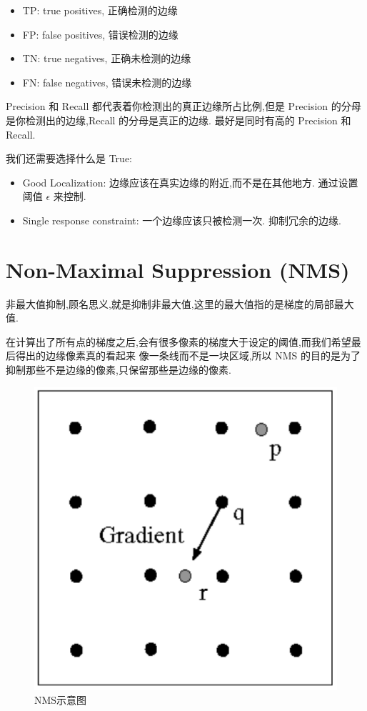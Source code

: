\begin{itemize}
    \item TP: true positives, 正确检测的边缘
    \item FP: false positives, 错误检测的边缘
    \item TN: true negatives, 正确未检测的边缘
    \item FN: false negatives, 错误未检测的边缘
\end{itemize}

Precision 和 Recall 都代表着你检测出的真正边缘所占比例,但是 Precision 的分母
是你检测出的边缘,Recall 的分母是真正的边缘. 最好是同时有高的 Precision 和 Recall.

\vspace{1em}

我们还需要选择什么是 True:

\begin{itemize}
    \item Good Localization: 边缘应该在真实边缘的附近,而不是在其他地方. 通过设置阈值 $\epsilon$ 来控制.
    \item Single response constraint: 一个边缘应该只被检测一次. 抑制冗余的边缘.
\end{itemize}

\section{Non-Maximal Suppression (NMS)}

非最大值抑制,顾名思义,就是抑制非最大值,这里的最大值指的是梯度的局部最大值.

在计算出了所有点的梯度之后,会有很多像素的梯度大于设定的阈值,而我们希望最后得出的边缘像素真的看起来
像一条线而不是一块区域,所以 NMS 的目的是为了抑制那些不是边缘的像素,只保留那些是边缘的像素.

\begin{figure}[htbp]
    \centering
	\includegraphics[scale=0.2]{figures/NMS.png}
	\caption{NMS示意图}
\end{figure}

